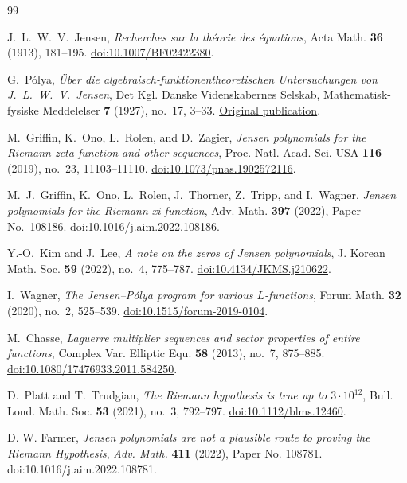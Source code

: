 \documentclass[11pt,reqno]{amsart}
\numberwithin{equation}{section}
\begin{document}
\begin{thebibliography}{99}

J.~L.~W.~V.~Jensen,
\emph{Recherches sur la th\'eorie des \'equations},
Acta Math. \textbf{36} (1913), 181--195.
\href{https://doi.org/10.1007/BF02422380}{doi:10.1007/BF02422380}.

G.~P\'olya,
\emph{\"Uber die algebraisch-funktionentheoretischen Untersuchungen
von J.~L.~W.~V.~Jensen},
Det Kgl. Danske Videnskabernes Selskab, Mathematisk-fysiske
Meddelelser \textbf{7} (1927), no.~17, 3--33.
\href{https://gymarkiv.sdu.dk/MFM/kdvs/mfm\%201-9/mfm-7-17.pdf}{Original publication}.

M.~Griffin, K.~Ono, L.~Rolen, and D.~Zagier,
\emph{Jensen polynomials for the Riemann zeta function and other sequences},
Proc. Natl. Acad. Sci. USA \textbf{116} (2019), no.~23, 11103--11110.
\href{https://doi.org/10.1073/pnas.1902572116}{doi:10.1073/pnas.1902572116}.

M.~J.~Griffin, K.~Ono, L.~Rolen, J.~Thorner, Z.~Tripp, and I.~Wagner,
\emph{Jensen polynomials for the Riemann xi-function},
Adv. Math. \textbf{397} (2022), Paper No.~108186.
\href{https://doi.org/10.1016/j.aim.2022.108186}{doi:10.1016/j.aim.2022.108186}.

Y.-O.~Kim and J.~Lee,
\emph{A note on the zeros of Jensen polynomials},
J. Korean Math. Soc. \textbf{59} (2022), no.~4, 775--787.
\href{https://doi.org/10.4134/JKMS.j210622}{doi:10.4134/JKMS.j210622}.

I.~Wagner,
\emph{The Jensen--P\'olya program for various $L$-functions},
Forum Math. \textbf{32} (2020), no.~2, 525--539.
\href{https://doi.org/10.1515/forum-2019-0104}{doi:10.1515/forum-2019-0104}.

M.~Chasse,
\emph{Laguerre multiplier sequences and sector properties of entire functions},
Complex Var. Elliptic Equ. \textbf{58} (2013), no.~7, 875--885.
\href{https://doi.org/10.1080/17476933.2011.584250}{doi:10.1080/17476933.2011.584250}.

D.~Platt and T.~Trudgian,
\emph{The Riemann hypothesis is true up to $3\cdot10^{12}$},
Bull. Lond. Math. Soc. \textbf{53} (2021), no.~3, 792--797.
\href{https://doi.org/10.1112/blms.12460}{doi:10.1112/blms.12460}.

D. W. Farmer,
\emph{Jensen polynomials are not a plausible route to proving
the Riemann Hypothesis},
\emph{Adv. Math.} \textbf{411} (2022),
Paper No. 108781.
doi:10.1016/j.aim.2022.108781.


\end{thebibliography}
\end{document}
